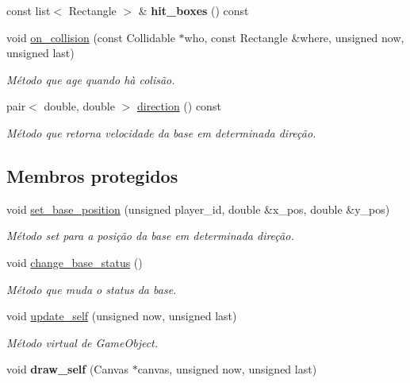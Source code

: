 \begin{DoxyCompactItemize}
\mbox{\label{classBase_a378997fa37a9d46f5c8fb02b090da00d}} 
const list$<$ Rectangle $>$ \& {\bfseries hit\+\_\+boxes} () const
\item 
void \mbox{\hyperlink{classBase_aacfcf7a911c60d8718219d45f8422449}{on\+\_\+collision}} (const Collidable $\ast$who, const Rectangle \&where, unsigned now, unsigned last)
\begin{DoxyCompactList}\small\item\em Método que age quando hà colisão. \end{DoxyCompactList}\item 
pair$<$ double, double $>$ \mbox{\hyperlink{classBase_a77dceab1d1d47769ab4072c18d8fe473}{direction}} () const
\begin{DoxyCompactList}\small\item\em Método que retorna velocidade da base em determinada direção. \end{DoxyCompactList}\end{DoxyCompactItemize}
\subsection*{Membros protegidos}
\begin{DoxyCompactItemize}
\item 
void \mbox{\hyperlink{classBase_a3345e924d2f7897f0818d476a990f2a2}{set\+\_\+base\+\_\+position}} (unsigned player\+\_\+id, double \&x\+\_\+pos, double \&y\+\_\+pos)
\begin{DoxyCompactList}\small\item\em Método set para a posição da base em determinada direção. \end{DoxyCompactList}\item 
void \mbox{\hyperlink{classBase_af95cdc748f2f72e35ff9e42a8a44eefe}{change\+\_\+base\+\_\+status}} ()
\begin{DoxyCompactList}\small\item\em Método que muda o status da base. \end{DoxyCompactList}\item 
void \mbox{\hyperlink{classBase_a04c92d862951b17a9f96ff43c738c2f9}{update\+\_\+self}} (unsigned now, unsigned last)
\begin{DoxyCompactList}\small\item\em Método virtual de Game\+Object. \end{DoxyCompactList}\item 
\mbox{\label{classBase_a63a037721de1f96a8197857f7451aba7}} 
void {\bfseries draw\+\_\+self} (Canvas $\ast$canvas, unsigned now, unsigned last)
\end{DoxyCompactItemize}
